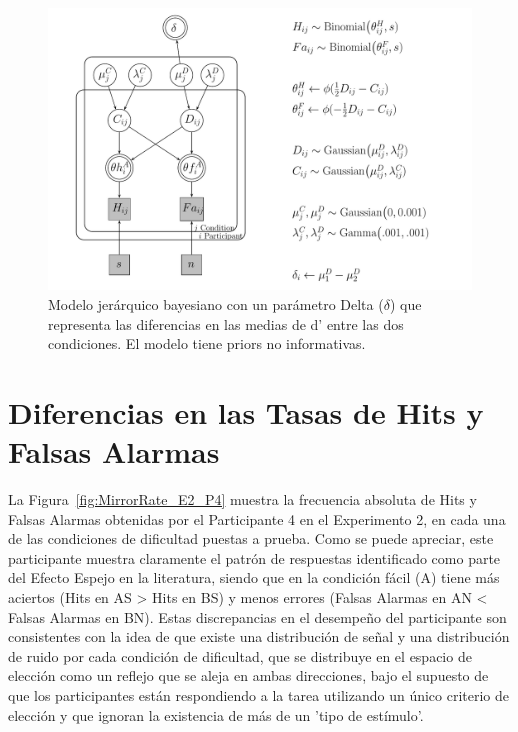 \begin{figure}[th]
\centering
\includegraphics[width=1.1\textwidth]{Figures/Model_Delta_Diff_D}
\caption[Modelo Delta: Un modelo jerárquico bayesiano para revisar las diferencias en d']{Modelo jerárquico bayesiano con un parámetro Delta ($\delta$) que representa las diferencias en las medias de d' entre las dos condiciones. El modelo tiene priors no informativas.}
\label{fig:Mod_Delta}
\end{figure}









\section{Diferencias en las Tasas de Hits y Falsas Alarmas}




La Figura~\ref{fig:MirrorRate_E2_P4} muestra la frecuencia absoluta de Hits y Falsas Alarmas obtenidas por el Participante 4 en el Experimento 2, en cada una de las condiciones de dificultad puestas a prueba. Como se puede apreciar, este participante muestra claramente el patrón de respuestas identificado como parte del Efecto Espejo en la literatura, siendo que en la condición fácil (A) tiene más aciertos (Hits en AS > Hits en BS) y menos errores (Falsas Alarmas en AN < Falsas Alarmas en BN). Estas discrepancias en el desempeño del participante son consistentes con la idea de que existe una distribución de señal y una distribución de ruido por cada condición de dificultad, que se distribuye en el espacio de elección como un reflejo que se aleja en ambas direcciones, bajo el supuesto de que los participantes están respondiendo a la tarea utilizando un único criterio de elección y que ignoran la existencia de más de un 'tipo de estímulo'.\\

